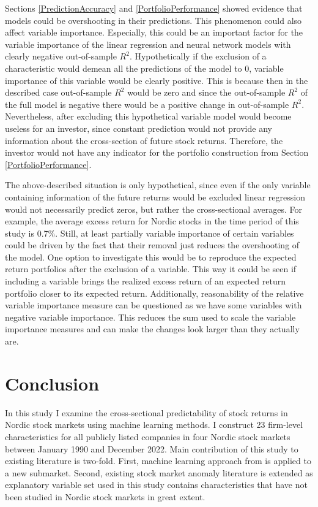 \documentclass[12pt]{article}
\begin{document}
Sections \ref{PredictionAccuracy} and \ref{PortfolioPerformance} showed evidence that models could be overshooting in their predictions. This phenomenon could also affect variable importance. Especially, this could be an important factor for the variable importance of the linear regression and neural network models with clearly negative out-of-sample $R^2$. Hypothetically if the exclusion of a characteristic would demean all the predictions of the model to 0, variable importance of this variable would be clearly positive. This is because then in the described case out-of-sample $R^2$ would be zero and since the out-of-sample $R^2$ of the full model is negative there would be a positive change in out-of-sample $R^2$. Nevertheless, after excluding this hypothetical variable model would become useless for an investor, since constant prediction would not provide any information about the cross-section of future stock returns. Therefore, the investor would not have any indicator for the portfolio construction from Section \ref{PortfolioPerformance}. \par

The above-described situation is only hypothetical, since even if the only variable containing information of the future returns would be excluded linear regression would not necessarily predict zeros, but rather the cross-sectional averages. For example, the average excess return for Nordic stocks in the time period of this study is 0.7\%. Still, at least partially variable importance of certain variables could be driven by the fact that their removal just reduces the overshooting of the model. One option to investigate this would be to reproduce the expected return portfolios after the exclusion of a variable. This way it could be seen if including a variable brings the realized excess return of an expected return portfolio closer to its expected return. Additionally, reasonability of the relative variable importance measure can be questioned as we have some variables with negative variable importance. This reduces the sum used to scale the variable importance measures and can make the changes look larger than they actually are. \par

\section{Conclusion}\label{Conclusion}

In this study I examine the cross-sectional predictability of stock returns in Nordic stock markets using machine learning methods. I construct 23 firm-level characteristics for all publicly listed companies in four Nordic stock markets between January 1990 and December 2022. Main contribution of this study to existing literature is two-fold. First, machine learning approach from \citet{guetal} is applied to a new submarket.\footnotemark {} Second, existing stock market anomaly literature is extended as explanatory variable set used in this study contains characteristics that have not been studied in Nordic stock markets in great extent. \par
\end{document}
